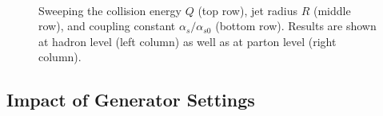 \documentclass[11pt,letterpaper]{article}
\begin{document}
\begin{figure}
{\label{fig:sweep_as_hadron}
}
$\quad$
\caption{Sweeping the collision energy $Q$ (top row), jet radius $R$ (middle row), and coupling constant $\alpha_s/\alpha_{s0}$ (bottom row).  Results are shown at hadron level (left column) as well as at parton level (right column).}
\label{fig:ee_sweep}
\end{figure}

\subsection{Impact of Generator Settings}
\end{document}
